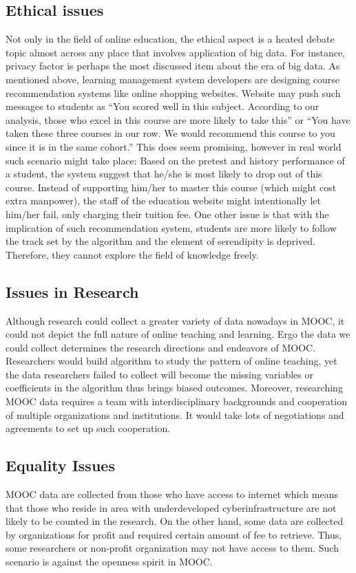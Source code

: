 \documentclass[sigconf]{acmart}
\begin{document}
\subsection{Ethical issues} 
Not only in the field of online education, the ethical aspect is a heated debate topic almost across any place that involves application of big data. For instance, privacy factor is perhaps the most discussed item about the era of big data. \cite{Manyika2011} As mentioned above, learning management system developers are designing course recommendation systems like online shopping websites. Website may push such messages to students as ``You scored well in this subject. According to our analysis, those who excel in this course are more likely to take this'' or ``You have taken these three courses in our row. We would recommend this course to you since it is in the same cohort.''
This does seem promising, however in real world such scenario might take place: Based on the pretest and history performance of a student, the system suggest that he/she is most likely to drop out of this course. Instead of supporting him/her to master this course (which might cost extra manpower), the staff of the education website might intentionally let him/her fail, only charging their tuition fee.\cite{Spector2013} One other issue is that with the implication of such recommendation system, students are more likely to follow the track set by the algorithm and the element of serendipity is deprived. Therefore, they cannot explore the field of knowledge freely. \cite{Robins1989}
\subsection{Issues in Research}
Although research could collect a greater variety of data nowadays in MOOC, it could not depict the full nature of online teaching and learning. Ergo the data we could collect determines the research directions and endeavors of MOOC. Researchers would build algorithm to study the pattern of online teaching, yet the data researchers failed to collect will become the missing variables or coefficients in the algorithm thus brings biased outcomes. Moreover, researching MOOC data requires a team with interdisciplinary backgrounds and cooperation of multiple organizations and institutions. It would take lots of negotiations and agreements to set up such cooperation. \cite{Boyd2012}
\subsection{Equality Issues}
MOOC data are collected from those who have access to internet which means that those who reside in area with underdeveloped cyberinfrastructure are not likely to be counted in the research. \cite{Eynon2012} On the other hand, some data are collected by organizations for profit and required certain amount of fee to retrieve. Thus, some researchers or non-profit organization may not have access to them. Such scenario is against the openness spirit in MOOC. 
\end{document}
